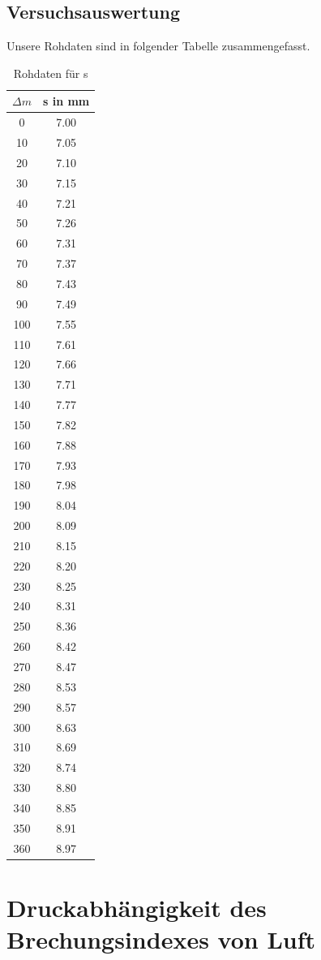 \documentclass[12pt,a4paper]{article}
\begin{document}
\subsection{Versuchsauswertung}
Unsere Rohdaten sind in folgender Tabelle zusammengefasst.
\begin{table}[H]\centering
	\begin{tabular}{c||c}
		$\Delta m$&s in mm\\
		\hline
		0&7.00\\
		10&7.05\\
		20&7.10\\
		30&7.15\\
		40&7.21\\
		50&7.26\\
		60&7.31\\
		70&7.37\\
		80&7.43\\
		90&7.49\\
		100&7.55\\
		110&7.61\\
		120&7.66\\
		130&7.71\\
		140&7.77\\
		150&7.82\\
		160&7.88\\
		170&7.93\\
		180&7.98\\
		190&8.04\\
		200&8.09\\
		210&8.15\\
		220&8.20\\
		230&8.25\\
		240&8.31\\
		250&8.36\\
		260&8.42\\
		270&8.47\\
		280&8.53\\
		290&8.57\\
		300&8.63\\
		310&8.69\\
		320&8.74\\
		330&8.80\\
		340&8.85\\
		350&8.91\\
		360&8.97\\
	\end{tabular}
	\caption{Rohdaten für s}\label{Tabelle}
\end{table}


\section{Druckabhängigkeit des Brechungsindexes von Luft}
\end{document}
